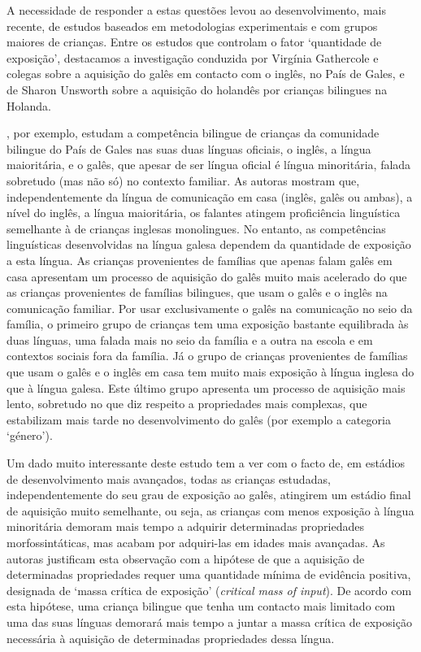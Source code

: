 \documentclass[output=paper]{LSP/langsci}
\begin{document}
A necessidade de responder a estas questões levou ao desenvolvimento, mais recente, de estudos baseados em metodologias experimentais e com grupos maiores de crianças. Entre os estudos que controlam o fator ‘quantidade de exposição’, destacamos a investigação conduzida por Virgínia Gathercole e colegas sobre a aquisição do galês em contacto com o inglês, no País de Gales, e de Sharon Unsworth sobre a aquisição do holandês por crianças bilingues na Holanda.

\cite{gathercolethomas2009}, por exemplo, estudam a competência bilingue de crianças da comunidade bilingue do País de Gales nas suas duas línguas oficiais, o inglês, a língua maioritária, e o galês, que apesar de ser língua oficial é língua minoritária, falada sobretudo (mas não só) no contexto familiar. As autoras mostram que, independentemente da língua de comunicação em casa (inglês, galês ou ambas), a nível do inglês, a língua maioritária, os falantes atingem proficiência linguística semelhante à de crianças inglesas monolingues. No entanto, as competências linguísticas desenvolvidas na língua galesa dependem da quantidade de exposição a esta língua. As crianças provenientes de famílias que apenas falam galês em casa apresentam um processo de aquisição do galês muito mais acelerado do que as crianças provenientes de famílias bilingues, que usam o galês e o inglês na comunicação familiar. Por usar exclusivamente o galês na comunicação no seio da família, o primeiro grupo de crianças tem uma exposição bastante equilibrada às duas línguas, uma falada mais no seio da família e a outra na escola e em contextos sociais fora da família. Já o grupo de crianças provenientes de famílias que usam o galês e o inglês em casa tem muito mais exposição à língua inglesa do que à língua galesa. Este último grupo apresenta um processo de aquisição mais lento, sobretudo no que diz respeito a propriedades mais complexas, que estabilizam mais tarde no desenvolvimento do galês (por exemplo a categoria `género'). 

Um dado muito interessante deste estudo tem a ver com o facto de, em estádios de desenvolvimento mais avançados, todas as crianças estudadas, independentemente do seu grau de exposição ao galês, atingirem um estádio final de aquisição muito semelhante, ou seja, as crianças com menos exposição à língua minoritária demoram mais tempo a adquirir determinadas propriedades morfossintáticas, mas acabam por adquiri-las em idades mais avançadas. As autoras justificam esta observação com a hipótese de que a aquisição de determinadas propriedades requer uma quantidade mínima de evidência positiva, designada de `massa crítica de exposição' (\textit{critical mass of input}). De acordo com esta hipótese, uma criança bilingue que tenha um contacto mais limitado com uma das suas línguas demorará mais tempo a juntar a massa crítica de exposição necessária à aquisição de determinadas propriedades dessa língua.
\end{document}
